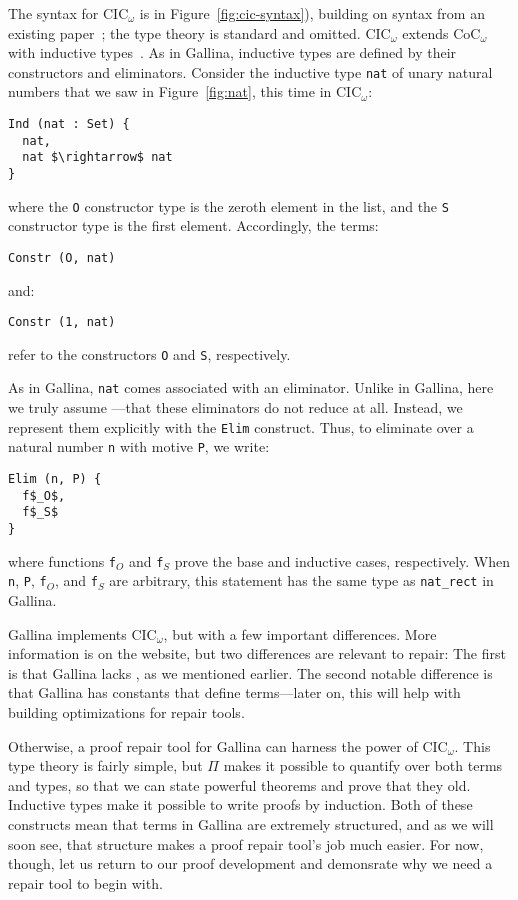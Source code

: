 The syntax for CIC$_{\omega}$ is in Figure~\ref{fig:cic-syntax}), building on syntax from an existing paper~\cite{Timany2015FirstST};
the type theory is standard and omitted. %
CIC$_{\omega}$ extends CoC$_{\omega}$ with inductive types~\cite{inductive}.
As in Gallina, inductive types are defined by their constructors and eliminators.
Consider the inductive type \lstinline{nat} of unary natural numbers that we saw in Figure~\ref{fig:nat},
this time in CIC$_{\omega}$: %

\begin{lstlisting}
Ind (nat : Set) {
  nat,
  nat $\rightarrow$ nat
}
\end{lstlisting}
where the \lstinline{O} constructor type is the zeroth element in the list, and the \lstinline{S} constructor type is the first element.
Accordingly, the terms:

\begin{lstlisting}
Constr (O, nat)
\end{lstlisting}
and:

\begin{lstlisting}
Constr (1, nat)
\end{lstlisting}
refer to the constructors \lstinline{O} and \lstinline{S}, respectively.

As in Gallina, \lstinline{nat} comes associated with an eliminator.
Unlike in Gallina, here we truly assume ---that these eliminators
do not reduce at all.
Instead, we represent them explicitly with the \lstinline{Elim} construct.
Thus, to eliminate over a natural number \lstinline{n} with motive \lstinline{P},
we write: %

\begin{lstlisting}
Elim (n, P) {
  f$_O$,
  f$_S$
}
\end{lstlisting}
where functions \lstinline{f}$_O$ and \lstinline{f}$_S$ prove the base and inductive cases, respectively.
When \lstinline{n}, \lstinline{P}, \lstinline{f}$_O$, and \lstinline{f}$_S$ are arbitrary,
this statement has the same type as \lstinline{nat_rect} in Gallina.

Gallina implements CIC$_{\omega}$, but with a few important differences.
More information is on the website, %
but two differences are relevant to repair:
The first is that Gallina lacks , as we mentioned earlier.
The second notable difference is that Gallina has constants that define terms---later on, this will help with building optimizations for repair tools.

Otherwise, a proof repair tool for Gallina can harness the power of CIC$_{\omega}$. This type theory is fairly simple,
but $\Pi$ makes it possible to quantify over both terms and types,
so that we can state powerful theorems and prove that they old.
Inductive types make it possible to write proofs by induction.
Both of these constructs mean that terms in Gallina are extremely structured,
and as we will soon see, that structure makes a proof repair tool's job much easier.
For now, though, let us return to our proof development and demonsrate why we need a repair tool to begin with.


